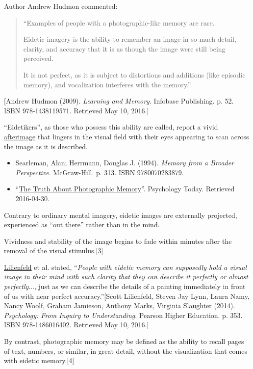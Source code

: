 \documentclass{book}
\numberwithin{equation}{section}
\begin{document}
Author Andrew Hudmon commented:
\begin{quotation}
    ``Examples of people with a photographic-like memory are rare.
    
    Eidetic imagery is the ability to remember an image in so much detail, clarity, and accuracy that it is as though the image were still being perceived.
    
    It is not perfect, as it is subject to distortions and additions (like episodic memory), and vocalization interferes with the memory.''
\end{quotation}
[Andrew Hudmon (2009). \textit{Learning and Memory}. Infobase Publishing. p. 52. ISBN 978-1438119571. Retrieved May 10, 2016.]

%
``Eidetikers'', as those who possess this ability are called, report a vivid \href{https://en.wikipedia.org/wiki/Afterimage}{afterimage} that lingers in the visual field with their eyes appearing to scan across the image as it is described.
\begin{itemize}
    \item Searleman, Alan; Herrmann, Douglas J. (1994). \textit{Memory from a Broader Perspective}. McGraw-Hill. p. 313. ISBN 9780070283879.
    \item ``\href{https://www.psychologytoday.com/articles/200603/the-truth-about-photographic-memory}{The Truth About Photographic Memory}''. Psychology Today. Retrieved 2016-04-30.
\end{itemize}
Contrary to ordinary mental imagery, eidetic images are externally projected, experienced as ``out there'' rather than in the mind.

Vividness and stability of the image begins to fade within minutes after the removal of the visual stimulus.[3]

\href{https://en.wikipedia.org/wiki/Scott_Lilienfeld}{Lilienfeld} et al. stated, ``\textit{People with eidetic memory can supposedly hold a visual image in their mind with such clarity that they can describe it perfectly or almost perfectly}$\ldots$, just as we can describe the details of a painting immediately in front of us with near perfect accuracy.''[Scott Lilienfeld, Steven Jay Lynn, Laura Namy, Nancy Woolf, Graham Jamieson, Anthony Marks, Virginia Slaughter (2014). \textit{Psychology: From Inquiry to Understanding}. Pearson Higher Education. p. 353. ISBN 978-1486016402. Retrieved May 10, 2016.]

%
By contrast, photographic memory may be defined as the ability to recall pages of text, numbers, or similar, in great detail, without the visualization that comes with eidetic memory.[4]
\end{document}
